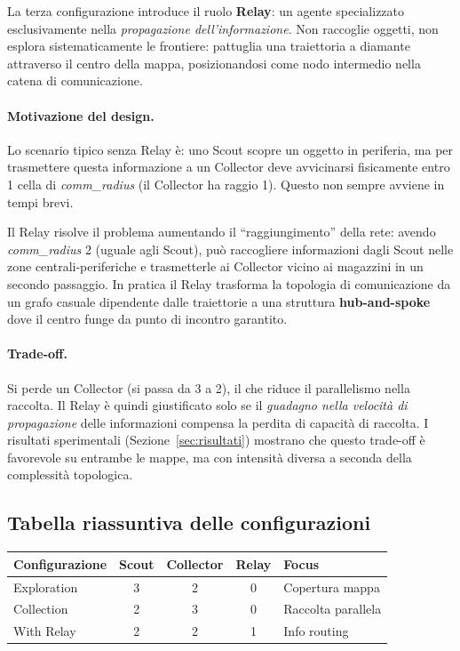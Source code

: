 La terza configurazione introduce il ruolo \textbf{Relay}: un agente specializzato esclusivamente nella \emph{propagazione dell'informazione}. Non raccoglie oggetti, non esplora sistematicamente le frontiere: pattuglia una traiettoria a diamante attraverso il centro della mappa, posizionandosi come nodo intermedio nella catena di comunicazione.

\paragraph{Motivazione del design.} Lo scenario tipico senza Relay è: uno Scout scopre un oggetto in periferia, ma per trasmettere questa informazione a un Collector deve avvicinarsi fisicamente entro 1 cella di \emph{comm\_radius} (il Collector ha raggio 1). Questo non sempre avviene in tempi brevi.

Il Relay risolve il problema aumentando il ``raggiungimento'' della rete: avendo \emph{comm\_radius} 2 (uguale agli Scout), può raccogliere informazioni dagli Scout nelle zone centrali-periferiche e trasmetterle ai Collector vicino ai magazzini in un secondo passaggio. In pratica il Relay trasforma la topologia di comunicazione da un grafo casuale dipendente dalle traiettorie a una struttura \textbf{hub-and-spoke} dove il centro funge da punto di incontro garantito.

\paragraph{Trade-off.} Si perde un Collector (si passa da 3 a 2), il che riduce il parallelismo nella raccolta. Il Relay è quindi giustificato solo se il \emph{guadagno nella velocità di propagazione} delle informazioni compensa la perdita di capacità di raccolta. I risultati sperimentali (Sezione~\ref{sec:risultati}) mostrano che questo trade-off è favorevole su entrambe le mappe, ma con intensità diversa a seconda della complessità topologica.

\subsection{Tabella riassuntiva delle configurazioni}

\begin{center}
\begin{tabular}{lcccl}
\toprule
\textbf{Configurazione} & \textbf{Scout} & \textbf{Collector} & \textbf{Relay} & \textbf{Focus} \\
\midrule
Exploration & 3 & 2 & 0 & Copertura mappa \\
Collection  & 2 & 3 & 0 & Raccolta parallela \\
With Relay  & 2 & 2 & 1 & Info routing \\
\bottomrule
\end{tabular}
\end{center}

